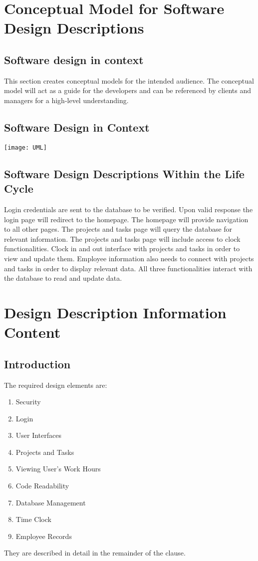 \documentclass[letterpaper,10pt,titlepage,journal,compsoc,draftclsnofoot,onecolumn]{IEEEtran}
\begin{document}
\section{Conceptual Model for Software Design Descriptions}
\subsection{Software design in context}

This section creates conceptual models for the intended audience. The conceptual model will act as a guide for the developers and can be referenced by clients and managers for a high-level understanding.

\subsection{Software Design in Context}

\texttt{[image: UML]}

\subsection{Software Design Descriptions Within the Life Cycle}

Login credentials are sent to the database to be verified. Upon valid response the login page will redirect to the homepage. The homepage will provide navigation to all other pages. The projects and tasks page will query the database for relevant information. The projects and tasks page will include access to clock functionalities. Clock in and out interface with projects and tasks in order to view and update them. Employee information also needs to connect with projects and tasks in order to display relevant data. All three functionalities interact with the database to read and update data. 

\section{Design Description Information Content}
\subsection{Introduction}

The required design elements are:
\begin{enumerate}
\item{Security}
\item{Login}
\item{User Interfaces}
\item{Projects and Tasks}
\item{Viewing User's Work Hours}
\item{Code Readability}
\item{Database Management}
\item{Time Clock}
\item{Employee Records}
\end{enumerate}
They are described in detail in the remainder of the clause.
\end{document}
